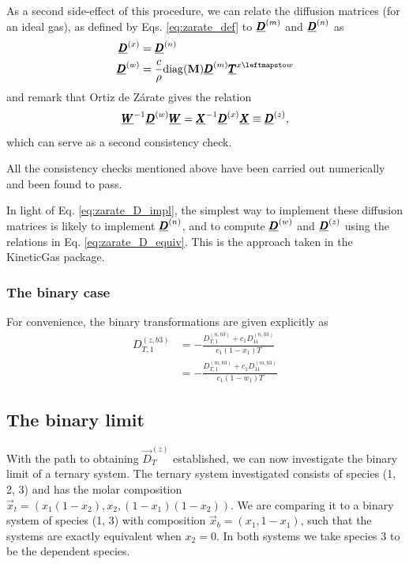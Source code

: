 As a second side-effect of this procedure, we can relate the diffusion matrices (for an ideal gas), as defined by Eqs. \eqref{eq:zarate_def} to $\underline{\pmb{D}}^{(m)}$ and $\underline{\pmb{D}}^{(n)}$ as
\begin{equation}
    \begin{split}
        \Mat{D}^{(x)} &= \Mat{D}^{(n)} \\
        \Mat{D}^{(w)} &= \frac{c}{\rho} \diag(\Vec{M}) \Mat{D}^{(m)} \Mat{T}^{x \leftmapsto w}
    \end{split}
    \label{eq:zarate_D_impl}
\end{equation}
and remark that Ortiz de Zárate gives the relation
\begin{equation}
    \underline{\pmb{W}}^{-1} \underline{\pmb{D}}^{(w)} \underline{\pmb{W}} = \underline{\pmb{X}}^{-1} \underline{\pmb{D}}^{(x)} \underline{\pmb{X}} \equiv \underline{\pmb{D}}^{(z)},
    \label{eq:zarate_D_equiv}
\end{equation}
which can serve as a second consistency check.

All the consistency checks mentioned above have been carried out numerically and been found to pass. 

In light of Eq. \eqref{eq:zarate_D_impl}, the simplest way to implement these diffusion matrices is likely to implement $\underline{\pmb{D}}^{(n)}$, and to compute $\underline{\pmb{D}}^{(w)}$ and $\underline{\pmb{D}}^{(z)}$ using the relations in Eq. \eqref{eq:zarate_D_equiv}. This is the approach taken in the KineticGas package.

\subsubsection{The binary case}

For convenience, the binary transformations are given explicitly as
\begin{equation}
    \begin{split}
        D_{T,1}^{(z,b3)} &= - \frac{D_{T,1}^{(n, b3)} + c_1 D_{11}^{(n, b3)}}{c_1 (1 - x_1) T} \\
        &= - \frac{D_{T,1}^{(m, b3)} + c_1 D_{11}^{(m, b3)}}{c_1 (1 - w_1) T}
    \end{split}
\end{equation}

\subsection{The binary limit}

With the path to obtaining $\Vec{D}_T^{(z)}$ established, we can now investigate the binary limit of a ternary system. The ternary system investigated consists of species (1, 2, 3) and has the molar composition $\Vec{x}_t = (x_1(1 - x_2), x_2, (1 - x_1)(1 - x_2))$. We are comparing it to a binary system of species (1, 3) with composition $\Vec{x}_b = (x_1, 1 - x_1)$, such that the systems are exactly equivalent when $x_2 = 0$. In both systems we take species 3 to be the dependent species.

